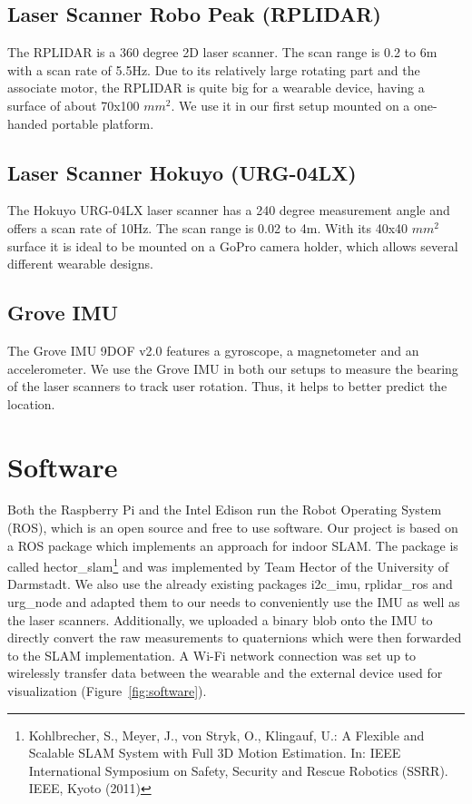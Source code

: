 \documentclass{sigchi-ext}
\begin{document}
\subsection{Laser Scanner Robo Peak (RPLIDAR)}
The RPLIDAR is a 360 degree 2D laser scanner. The scan range is 0.2 to 6m with a scan rate of 5.5Hz. Due to its relatively large rotating part and the associate motor, the RPLIDAR is quite big for a wearable device, having a surface of about 70x100 $mm^2$. We use it in our first setup mounted on a one-handed portable platform.

\subsection{Laser Scanner Hokuyo (URG-04LX)}
The Hokuyo URG-04LX laser scanner has a 240 degree measurement angle and offers a scan rate of 10Hz. The scan range is 0.02 to 4m. With its 40x40 $mm^2$ surface it is ideal to be mounted on a GoPro camera holder, which allows several different wearable designs.

\subsection{Grove IMU}
The Grove IMU 9DOF v2.0 features a gyroscope, a magnetometer and an accelerometer. We use the Grove IMU in both our setups to measure the bearing of the laser scanners to track user rotation. Thus, it helps to better predict the location.

\section{Software}
Both the Raspberry Pi and the Intel Edison run the Robot Operating System (ROS), which is an open source and free to use software. Our project is based on a ROS package which implements an approach for indoor SLAM. The package is called hector\_slam\footnote{ Kohlbrecher, S., Meyer, J., von Stryk, O., Klingauf, U.: A Flexible and Scalable
SLAM System with Full 3D Motion Estimation. In: IEEE International Symposium
on Safety, Security and Rescue Robotics (SSRR). IEEE, Kyoto (2011)} and was implemented by Team Hector of the University of Darmstadt. We also use the already existing packages i2c\_imu, rplidar\_ros and urg\_node and adapted them to our needs to conveniently use the IMU as well as the laser scanners. Additionally, we uploaded a binary blob onto the IMU to directly convert the raw measurements to quaternions which were then forwarded to the SLAM implementation. A Wi-Fi network connection was set up to wirelessly transfer data between the wearable and the external device used for visualization (Figure~\ref{fig:software}).
\end{document}
